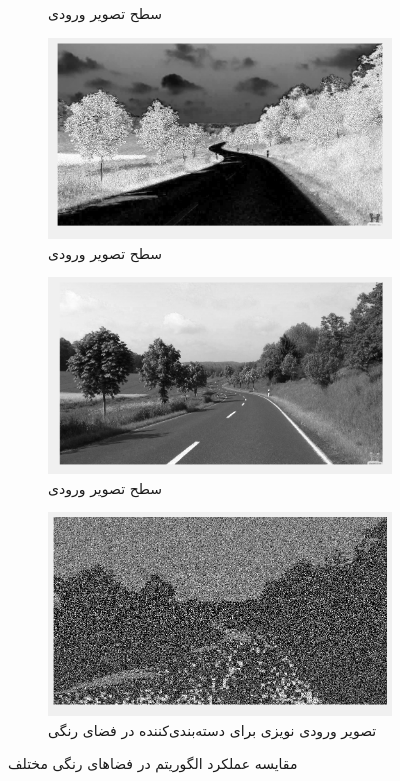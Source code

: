 \documentclass[11.5pt,a4paper]{article}
\begin{document}
\begin{figure}[h]
\begin{subfigure}{0.4\textwidth}
	\caption{سطح  تصویر ورودی}
	\end{subfigure}
	\begin{subfigure}{0.4\textwidth}
	\includegraphics[scale=0.2]{Imgs/MRF_S.png}
	\caption{سطح  تصویر ورودی}
	\end{subfigure}	
	\begin{subfigure}{0.4\textwidth}
	\includegraphics[scale=0.2]{Imgs/MRF_V.png}
	\caption{سطح  تصویر ورودی}
	\end{subfigure}	
	\begin{subfigure}{0.4\textwidth}
	\includegraphics[scale=0.2]{Imgs/MRF_H_In.png}
	\caption{تصویر ورودی نویزی برای دسته‌بندی‌کننده در فضای رنگی }
	\end{subfigure}	
\caption{مقایسه عملکرد الگوریتم در فضاهای رنگی مختلف}
\label{fig:HSV}
\end{figure}
\end{document}
